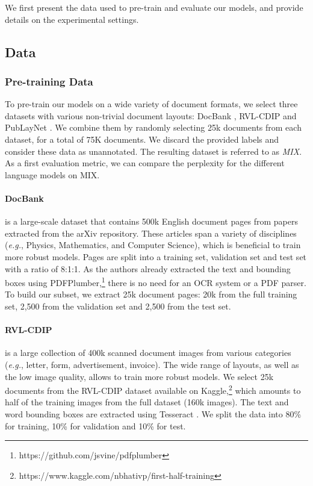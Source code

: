We first present the data used to pre-train and evaluate our models, and provide details on the experimental settings. 

\subsection{Data}

\subsubsection{Pre-training Data}

To pre-train our models on a wide variety of document formats, we select three datasets with various non-trivial document layouts: DocBank \citep{li2020docbank}, RVL-CDIP \citep{harley2015evaluation} and PubLayNet \citep{zhong2019publaynet}. We combine them by randomly selecting 25k documents from each dataset, for a total of 75K documents. We discard the provided labels and consider these data as unannotated. The resulting dataset is referred to as \textit{MIX}. As a first evaluation metric, we can compare the perplexity for the different language models on MIX. 

\paragraph{DocBank} \citep{li2020docbank} is a large-scale dataset that contains 500k English document pages from papers extracted from the arXiv repository. These articles span a variety of disciplines (\textit{e.g.}, Physics, Mathematics, and Computer Science), which is beneficial to train more robust models. Pages are split into a training set, validation set and test set with a ratio of 8:1:1. As the authors already extracted the text and bounding boxes using PDFPlumber,\footnote{https://github.com/jsvine/pdfplumber} there is no need for an \ac{OCR} system or a PDF parser. To build our subset, we extract 25k document pages: 20k from the full training set, 2,500 from the validation set and 2,500 from the test set. 

\paragraph{RVL-CDIP} \citep{harley2015evaluation} is a large collection of 400k scanned document images from various categories (\textit{e.g.}, letter, form, advertisement, invoice). The wide range of layouts, as well as the low image quality, allows to train more robust models. We select 25k documents from the RVL-CDIP dataset available on Kaggle,\footnote{https://www.kaggle.com/nbhativp/first-half-training} which amounts to half of the training images from the full dataset (160k images). The text and word bounding boxes are extracted using Tesseract \citep{kay2007tesseract}. We split the data into 80\% for training, 10\% for validation and 10\% for test.

